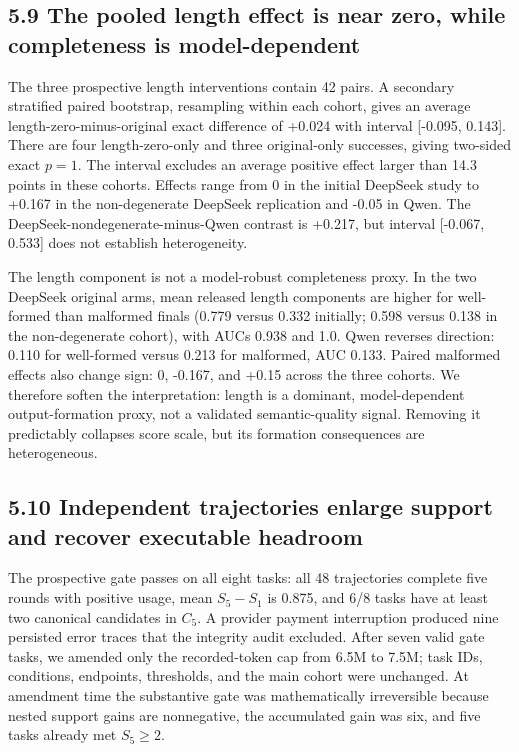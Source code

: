 \documentclass{article}
\begin{document}
\subsection{5.9 The pooled length effect is near zero, while completeness is model-dependent}

The three prospective length interventions contain 42 pairs. A secondary stratified paired bootstrap, resampling within each cohort, gives an average length-zero-minus-original exact difference of +0.024 with interval [-0.095, 0.143]. There are four length-zero-only and three original-only successes, giving two-sided exact \(p=1\). The interval excludes an average positive effect larger than 14.3 points in these cohorts. Effects range from 0 in the initial DeepSeek study to +0.167 in the non-degenerate DeepSeek replication and -0.05 in Qwen. The DeepSeek-nondegenerate-minus-Qwen contrast is +0.217, but interval [-0.067, 0.533] does not establish heterogeneity.

The length component is not a model-robust completeness proxy. In the two DeepSeek original arms, mean released length components are higher for well-formed than malformed finals (0.779 versus 0.332 initially; 0.598 versus 0.138 in the non-degenerate cohort), with AUCs 0.938 and 1.0. Qwen reverses direction: 0.110 for well-formed versus 0.213 for malformed, AUC 0.133. Paired malformed effects also change sign: 0, -0.167, and +0.15 across the three cohorts. We therefore soften the interpretation: length is a dominant, model-dependent output-formation proxy, not a validated semantic-quality signal. Removing it predictably collapses score scale, but its formation consequences are heterogeneous.

\subsection{5.10 Independent trajectories enlarge support and recover executable headroom}

The prospective gate passes on all eight tasks: all 48 trajectories complete five rounds with positive usage, mean \(S_5-S_1\) is 0.875, and 6/8 tasks have at least two canonical candidates in \(C_5\). A provider payment interruption produced nine persisted error traces that the integrity audit excluded. After seven valid gate tasks, we amended only the recorded-token cap from 6.5M to 7.5M; task IDs, conditions, endpoints, thresholds, and the main cohort were unchanged. At amendment time the substantive gate was mathematically irreversible because nested support gains are nonnegative, the accumulated gain was six, and five tasks already met \(S_5\ge2\).
\end{document}
